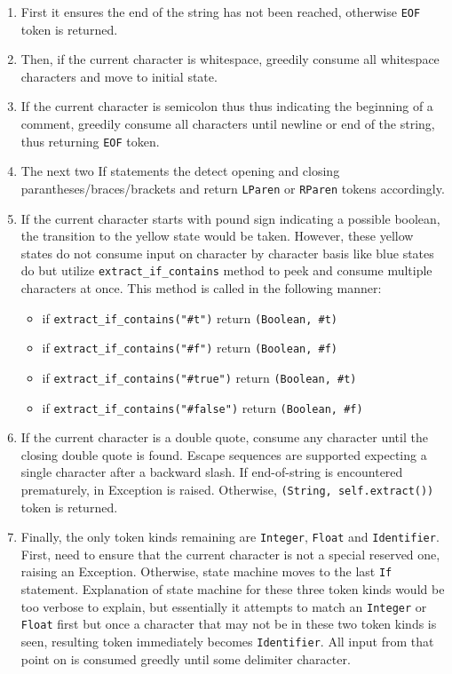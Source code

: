 \begin{itemize}
\begin{enumerate}
\item First it ensures the end of the string has not been reached, otherwise \texttt{EOF} token is returned. 
\item Then, if the current character is whitespace, greedily consume all whitespace characters and move to initial state.
\item If the current character is semicolon thus thus indicating the beginning of a comment, greedily consume all characters until newline or end of the string, thus returning \texttt{EOF} token. 
\item The next two If statements the detect opening and closing parantheses/braces/brackets and return \texttt{LParen} or \texttt{RParen} tokens accordingly.
\item If the current character starts with pound sign indicating a possible boolean, the transition to the yellow state would be taken. However, these yellow states do not consume input on character by character basis like blue states do but utilize \texttt{extract\_if\_contains} method to peek and consume multiple characters at once. This method is called in the following manner:
\begin{itemize}
\item
if \texttt{extract\_if\_contains("\#t")} return \texttt{(Boolean, \#t)}
\item
if \texttt{extract\_if\_contains("\#f")} return \texttt{(Boolean, \#f)}
\item
if \texttt{extract\_if\_contains("\#true")} return \texttt{(Boolean, \#t)}
\item
if \texttt{extract\_if\_contains("\#false")} return \texttt{(Boolean, \#f)}
\end{itemize}

\item If the current character is a double quote, consume any character until the closing double quote is found. Escape sequences are supported expecting a single character after a backward slash. If end-of-string is encountered prematurely, in Exception is raised. Otherwise, \texttt{(String, self.extract())} token is returned.

\item Finally, the only token kinds remaining are \texttt{Integer}, \texttt{Float} and \texttt{Identifier}. First, need to ensure that the current character is not a special reserved one, raising an Exception. Otherwise, state machine moves to the last \texttt{If} statement. Explanation of state machine for these three token kinds would be too verbose to explain, but essentially it attempts to match an \texttt{Integer} or \texttt{Float} first but once a character that may not be in these two token kinds is seen, resulting token immediately becomes \texttt{Identifier}. All input from that point on is consumed greedly until some delimiter character.
\end{enumerate}

\end{itemize}

